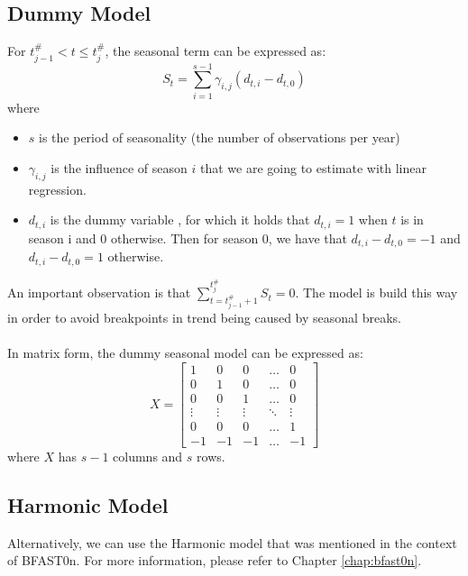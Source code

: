 \documentclass[main.tex]{subfiles}
\begin{document}
\subsection{Dummy Model}
For $t_{j-1}^{\#} < t \leq t_j^{\#}$, the seasonal term can be expressed as:
\[
S_t = \sum_{i=1}^{s-1}\gamma_{i,j}(d_{t, i} - d_{t, 0})
\]
where
\begin{itemize}
\item $s$ is the period of seasonality (the number of observations per year)
\item $\gamma_{i,j}$  is the influence of season $i$ that we are going to estimate
with linear regression. 
\item $d_{t,i}$ is the dummy variable \cite{makridakis}, for which it holds that
  $d_{t,i} = 1$ when $t$ is in season i and 0 otherwise. Then for season 0, we
  have that $d_{t, i} - d_{t, 0} = -1$ and $d_{t, i} - d_{t, 0} = 1$ otherwise.
\end{itemize}
An important observation is that $\sum_{t=t_{j-1}^{\#}+1}^{t_j^{\#}}S_t = 0$.
The model is build this way in order to avoid breakpoints in
trend being caused by seasonal breaks. \\\\
In matrix form, the dummy seasonal model can be expressed as:
\[
X =
\begin{bmatrix}
 1 & 0 & 0 & \hdots & 0\\
 0 & 1 & 0 & \hdots & 0 \\
 0 & 0 & 1 & \hdots & 0 \\
\vdots & \vdots & \vdots & \ddots & \vdots \\
 0 & 0 & 0 & \hdots & 1 \\
 -1 & -1 & -1 & \hdots & -1 
\end{bmatrix}
\]
where $X$ has $s-1$ columns and $s$ rows.

\subsection{Harmonic Model}
Alternatively, we can use the Harmonic model that was mentioned in the context
of BFAST0n. For more information, please refer to Chapter \ref{chap:bfast0n}.
\end{document}
